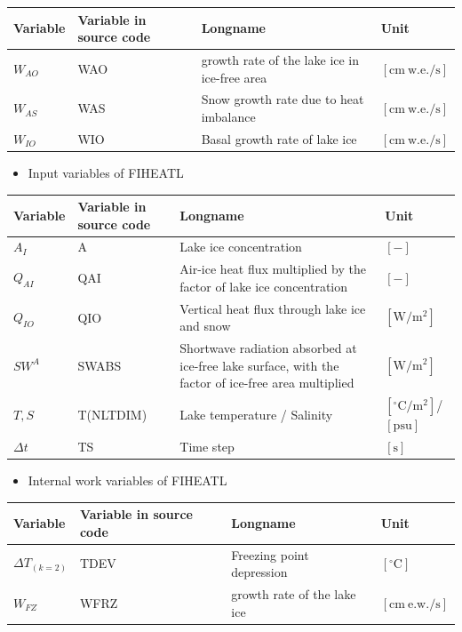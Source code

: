 \begin{longtable}[]{@{}llll@{}}
\toprule\noalign{}
Variable & Variable in source code & Longname & Unit \\
\midrule\noalign{}
\endhead
\bottomrule\noalign{}
\endlastfoot
\(W_{AO}\) & WAO & growth rate of the lake ice in ice-free area & \(\mathrm{[cm\ w.e./s]}\) \\
\(W_{AS}\) & WAS & Snow growth rate due to heat imbalance & \(\mathrm{[cm\ w.e./s]}\) \\
\(W_{IO}\) & WIO & Basal growth rate of lake ice & \(\mathrm{[cm\ w.e./s]}\) \\
\end{longtable}

\begin{itemize}
\tightlist
\item
  Input variables of FIHEATL
\end{itemize}

\begin{landscape}

\begin{longtable}[]{@{}llll@{}}
\toprule\noalign{}
Variable & Variable in source code & Longname & Unit \\
\midrule\noalign{}
\endhead
\bottomrule\noalign{}
\endlastfoot
\(A_I\) & A & Lake ice concentration & \(\mathrm{[-]}\) \\
\(Q_{AI}\) & QAI & Air-ice heat flux multiplied by the factor of lake ice concentration & \(\mathrm{[-]}\) \\
\(Q_{IO}\) & QIO & Vertical heat flux through lake ice and snow & \(\mathrm{[W/m^2]}\) \\
\(SW^A\) & SWABS & Shortwave radiation absorbed at ice-free lake surface, with the factor of ice-free area multiplied & \(\mathrm{[W/m^2]}\) \\
\(T, S\) & T(NLTDIM) & Lake temperature / Salinity & \(\mathrm{[^\circ C/m^2]}\)/ \(\mathrm{[psu]}\) \\
\(\Delta t\) & TS & Time step & \(\mathrm{[s]}\) \\
\end{longtable}

\end{landscape}

\begin{itemize}
\tightlist
\item
  Internal work variables of FIHEATL
\end{itemize}

\begin{longtable}[]{@{}llll@{}}
\toprule\noalign{}
Variable & Variable in source code & Longname & Unit \\
\midrule\noalign{}
\endhead
\bottomrule\noalign{}
\endlastfoot
\(\Delta T_{(k=2)}\) & TDEV & Freezing point depression & \(\mathrm{[^\circ C]}\) \\
\(W_{FZ}\) & WFRZ & growth rate of the lake ice & \(\mathrm{[cm\ e.w./s]}\) \\
\end{longtable}

